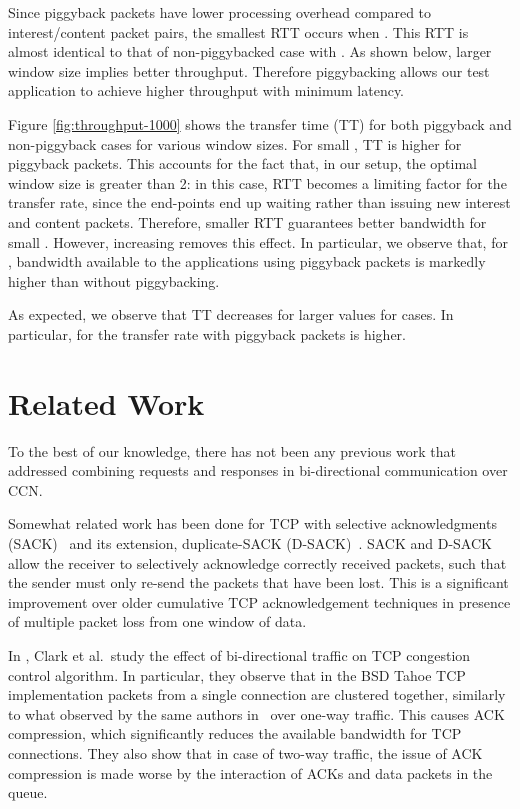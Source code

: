 \documentclass[conference]{IEEEtran}
\begin{document}
Since piggyback packets have lower processing overhead compared to 
interest/content packet pairs, the smallest RTT occurs
when . This RTT is almost identical to that of non-piggybacked case 
with . As shown below, larger window size implies better throughput. Therefore 
piggybacking allows our test application to achieve higher throughput with minimum latency.

Figure \ref{fig:throughput-1000} shows the transfer time (TT) for both piggyback and 
non-piggyback cases for various window sizes. For small , TT  is 
higher for piggyback packets. This accounts for the fact that, in our setup, the 
optimal window size is greater than 2: in this case, RTT becomes a limiting factor for the
transfer rate, since the end-points end up waiting rather than issuing new interest 
and content packets. Therefore, smaller RTT guarantees better bandwidth 
for small . However, increasing  removes this effect. In particular, we 
observe that, for , bandwidth available to the applications using piggyback 
packets is markedly higher than without piggybacking.

As expected, we observe that TT decreases for larger values  for 
cases. In particular, for  the transfer rate with 
piggyback packets is higher.


\section{Related Work}
\label{sec:related-work}
To the best of our knowledge, there has not been any previous work that addressed
combining requests and responses in bi-directional communication over CCN.

Somewhat related work has been done for TCP with selective acknowledgments 
(SACK)~\cite{rfc2018} and its extension, duplicate-SACK (D-SACK)~\cite{rfc2883}. 
SACK and D-SACK allow the receiver to selectively acknowledge correctly received packets, such
that the sender must only re-send the packets that have been lost. This is a significant improvement 
over older cumulative TCP acknowledgement techniques in presence of multiple packet loss from 
one window of data.

In \cite{clark91}, Clark et al.~study the effect of bi-directional traffic on TCP congestion control algorithm. In particular, they observe that in the BSD Tahoe TCP implementation packets from a single connection are clustered together, similarly to what observed by the same authors in~\cite{clark90} over one-way traffic. This causes ACK compression, which significantly reduces the available bandwidth for TCP connections. They also show that in case of two-way traffic, the issue of ACK compression is made worse by the interaction of ACKs and data packets in the queue.
\end{document}
